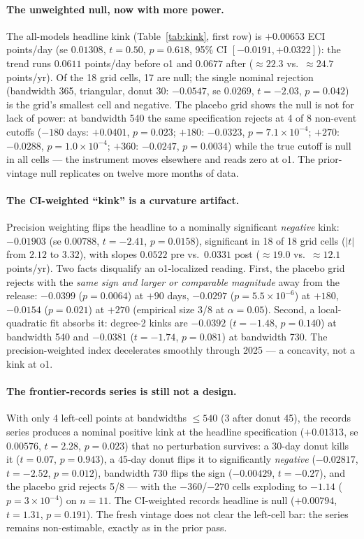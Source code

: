 \documentclass[11pt]{article}
\begin{document}
\paragraph{The unweighted null, now with more power.} The all-models headline
kink (Table~\ref{tab:kink}, first row) is $+0.00653$ ECI points/day (se
$0.01308$, $t=0.50$, $p=0.618$, 95\% CI $[-0.0191, +0.0322]$): the trend runs
$0.0611$ points/day before o1 and $0.0677$ after ($\approx22.3$ vs.\
$\approx24.7$ points/yr). Of the 18 grid cells, 17 are null; the single
nominal rejection (bandwidth 365, triangular, donut 30: $-0.0547$, se
$0.0269$, $t=-2.03$, $p=0.042$) is the grid's smallest cell and negative.
The placebo grid shows the null is not for lack of power: at bandwidth 540
the same specification rejects at 4 of 8 non-event cutoffs ($-180$ days:
$+0.0401$, $p=0.023$; $+180$: $-0.0323$, $p=7.1\times10^{-4}$; $+270$:
$-0.0288$, $p=1.0\times10^{-4}$; $+360$: $-0.0247$, $p=0.0034$) while the
true cutoff is null in all cells --- the instrument moves elsewhere and reads
zero at o1. The prior-vintage null replicates on twelve more months of data.

\paragraph{The CI-weighted ``kink'' is a curvature artifact.} Precision
weighting flips the headline to a nominally significant \emph{negative} kink:
$-0.01903$ (se $0.00788$, $t=-2.41$, $p=0.0158$), significant in 18 of 18
grid cells ($|t|$ from $2.12$ to $3.32$), with slopes $0.0522$ pre vs.\
$0.0331$ post ($\approx19.0$ vs.\ $\approx12.1$ points/yr). Two facts
disqualify an o1-localized reading. First, the placebo grid rejects with the
\emph{same sign and larger or comparable magnitude} away from the release:
$-0.0399$ ($p=0.0064$) at $+90$ days, $-0.0297$ ($p=5.5\times10^{-6}$) at
$+180$, $-0.0154$ ($p=0.021$) at $+270$ (empirical size 3/8 at
$\alpha=0.05$). Second, a local-quadratic fit absorbs it: degree-2 kinks are
$-0.0392$ ($t=-1.48$, $p=0.140$) at bandwidth 540 and $-0.0381$ ($t=-1.74$,
$p=0.081$) at bandwidth 730. The precision-weighted index decelerates
smoothly through 2025 --- a concavity, not a kink at o1.

\paragraph{The frontier-records series is still not a design.} With only 4
left-cell points at bandwidths $\leq540$ (3 after donut 45), the records
series produces a nominal positive kink at the headline specification
($+0.01313$, se $0.00576$, $t=2.28$, $p=0.023$) that no perturbation
survives: a 30-day donut kills it ($t=0.07$, $p=0.943$), a 45-day donut flips
it to significantly \emph{negative} ($-0.02817$, $t=-2.52$, $p=0.012$),
bandwidth 730 flips the sign ($-0.00429$, $t=-0.27$), and the placebo grid
rejects 5/8 --- with the $-360$/$-270$ cells exploding to $-1.14$
($p=3\times10^{-4}$) on $n=11$. The CI-weighted records headline is null
($+0.00794$, $t=1.31$, $p=0.191$). The fresh vintage does not clear the
left-cell bar: the series remains non-estimable, exactly as in the prior
pass.
\end{document}
